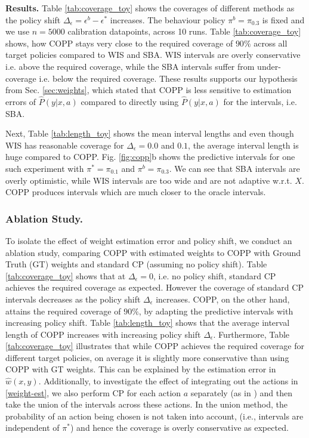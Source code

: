\textbf{Results.} Table \ref{tab:coverage_toy} shows the coverages of different methods as the policy shift $\Delta_{\epsilon}=\epsilon^b - \epsilon^*$ increases. The behaviour policy $\pi^b = \pi_{0.3}$ is fixed and we use $n=5000$ calibration datapoints, across 10 runs. Table \ref{tab:coverage_toy} shows, how COPP stays very close to the required coverage of $90\%$ across all target policies compared to WIS and SBA. WIS intervals are overly conservative i.e. above the required coverage, while the SBA intervals suffer from under-coverage i.e. below the required coverage. These results supports our hypothesis from Sec. \ref{sec:weights}, which stated that COPP is less sensitive to estimation errors of $\hat{P}(y|x, a)$ compared to directly using $\hat{P}(y|x, a)$ for the intervals, i.e. SBA. 

Next, Table \ref{tab:length_toy} shows the mean interval lengths and even though WIS has reasonable coverage for $\Delta_{\epsilon}=0.0$ and $0.1$, the average interval length is huge compared to COPP. Fig. \ref{fig:copp}b shows the predictive intervals for one such experiment with $\pi^* = \pi_{0.1}$ and $\pi^b = \pi_{0.3}$. We can see that SBA intervals are overly optimistic, while WIS intervals are too wide and are not adaptive w.r.t. $X$. COPP produces intervals which are much closer to the oracle intervals. 

\subsubsection{Ablation Study.} 

To isolate the effect of weight estimation error and policy shift, we conduct an ablation study, comparing COPP with estimated weights to COPP with Ground Truth (GT) weights and standard CP (assuming no policy shift). Table \ref{tab:coverage_toy} shows that at $\Delta_\epsilon = 0$, i.e. no policy shift, standard CP achieves the required coverage as expected. However the coverage of standard CP intervals decreases as the policy shift $\Delta_\epsilon$ increases. COPP, on the other hand, attains the required coverage of $90\%$, by adapting the predictive intervals with increasing policy shift. Table \ref{tab:length_toy} shows that the average interval length of COPP increases with increasing policy shift $\Delta_\epsilon$. Furthermore, Table \ref{tab:coverage_toy} illustrates that while COPP achieves the required coverage for different target policies, on average it is slightly more conservative than using COPP with GT weights. This can be explained by the estimation error in $\hat{w}(x,y)$. Additionally, to investigate the effect of integrating out the actions in \eqref{weight-est}, we also perform CP for each action $a$ separately (as in \cite{lei2020conformal}) and then take the union of the intervals across these actions. In the union method, the probability of an action being chosen is not taken into account, (i.e., intervals are independent of $\pi^*$) and hence the coverage is overly conservative as expected.


